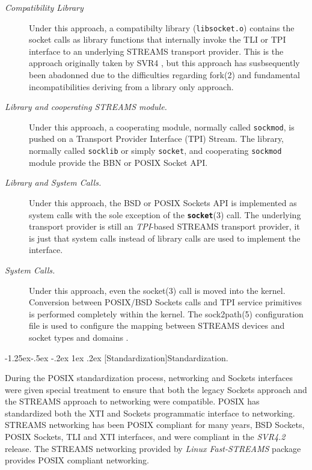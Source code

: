 \documentclass[letterpaper,final,notitlepage,twocolumn,10pt,twoside]{article}
\makeatletter
\renewcommand\subsubsection{\@startsection{subsubsection}{3}{\z@}%
                                     {-1.25ex\@plus -.5ex \@minus -.2ex}%
                                     {1ex \@plus .2ex}%
                                     {\normalfont\normalsize\bfseries}}
\makeatother
\begin{document}
\begin{description}

\item[{\it Compatibility Library}]

Under this approach, a compatibilty library (\texttt{libsocket.o}) contains
the socket calls as library functions that internally invoke the TLI or TPI
interface to an underlying STREAMS transport provider.  This is the approach
originally taken by SVR4 \cite[]{magic}, but this approach has susbsequently
been abadonned due to the difficulties regarding fork(2) and fundamental
incompatibilities deriving from a library only approach.

\item[{\it Library and cooperating \sl STREAMS module.}]

Under this approach, a cooperating module, normally called \texttt{sockmod},
is pushed on a Transport Provider Interface (TPI) Stream.  The library,
normally called \texttt{socklib} or simply \texttt{socket}, and cooperating
\texttt{sockmod} module provide the BBN or POSIX Socket API.  \cite[]{impbsd}
\cite[]{socklib}

\item[{\it Library and System Calls.}]

Under this approach, the BSD or POSIX Sockets API is implemented as system
calls with the sole exception of the \textbf{\texttt{socket}}(3) call.  The
underlying transport provider is still an \textsl{TPI}-based STREAMS transport
provider, it is just that system calls instead of library calls are used to
implement the interface.  \cite[]{socklib}

\item[{\it System Calls.}]

Under this approach, even the socket(3) call is moved into the kernel.
Conversion between POSIX/BSD Sockets calls and TPI service primitives is
performed completely within the kernel.  The sock2path(5) configuration file
is used to configure the mapping between STREAMS devices and socket types and
domains \cite[]{socklib}.

\end{description}

\subsubsection[Standardization]{Standardization.}

During the POSIX standardization process, networking and Sockets interfaces
were given special treatment to ensure that both the legacy Sockets approach
and the STREAMS approach to networking were compatible. POSIX has standardized
both the XTI and Sockets programmatic interface to networking.  STREAMS
networking has been POSIX compliant for many years, BSD Sockets, POSIX
Sockets, TLI and XTI interfaces, and were compliant in the \textsl{SVR4.2}
release.  The STREAMS networking provided by \textsl{Linux Fast-STREAMS}
package provides POSIX compliant networking.
\end{document}

